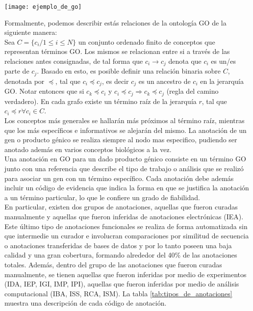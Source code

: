 \begin{center}
    \texttt{[image: ejemplo\_de\_go]}
    \label{fig:ejemplo_de_go}
\end{center}
Formalmente, podemos describir estás relaciones de la ontología GO de la siguiente manera:\\
Sea $C=\{c_i / 1\leq i \leq N\}$ un conjunto ordenado finito de conceptos que representan términos GO. Los mismos se relacionan entre si a través de las relaciones antes consignadas, de tal forma que $c_i \rightarrow c_j$ denota que $c_i$ es un/es parte de $c_j$. Basado en esto, es posible definir una relación binaria sobre $C$, denotada por $\preceq$, tal que $c_i \preceq c_j$, es decir $c_j$ es un ancestro de $c_i$ en la jerarquía GO. Notar entonces que si $c_k \preceq c_i$ y $c_i \preceq c_j \Rightarrow c_k \preceq c_j$ (regla del camino verdadero). En cada grafo existe un término raíz de la jerarquía $r$, tal que $c_i \preceq r \forall c_i \in C$.\\
Los conceptos más generales se hallarán más próximos al término raíz, mientras que los más específicos e informativos se alejarán del mismo. La anotación de un gen o producto génico se realiza siempre al nodo mas especifico, pudiendo ser anotado además en varios conceptos biológicos a la vez.\\
Una anotación en GO para un dado producto génico consiste en un término GO junto con una referencia que describe el tipo de trabajo o análisis que se realizó para asociar un gen con un término específico. Cada anotación debe además incluir un código de evidencia que indica la forma en que se justifica la anotación a un término particular, lo que le confiere un grado de fiabilidad.\\En particular, existen dos grupos de anotaciones, aquellas que fueron curadas manualmente y aquellas que fueron inferidas de anotaciones electrónicas (IEA). Este último tipo de anotaciones funcionales se realiza de forma automatizada sin que intermedie un curador e involucran comparaciones por similitud de secuencia o anotaciones transferidas de bases de datos y por lo tanto poseen una baja calidad y una gran cobertura, formando alrededor del 40\% de las anotaciones totales. Además, dentro del grupo de las anotaciones que fueron curadas manualmente, se tienen aquellas que fueron inferidas por medio de experimentos (IDA, IEP, IGI, IMP, IPI), aquellas que fueron inferidas por medio de análisis computacional (IBA, ISS, RCA, ISM). La tabla \ref{tab:tipos_de_anotaciones} muestra una descripción de cada código de anotación.\\

